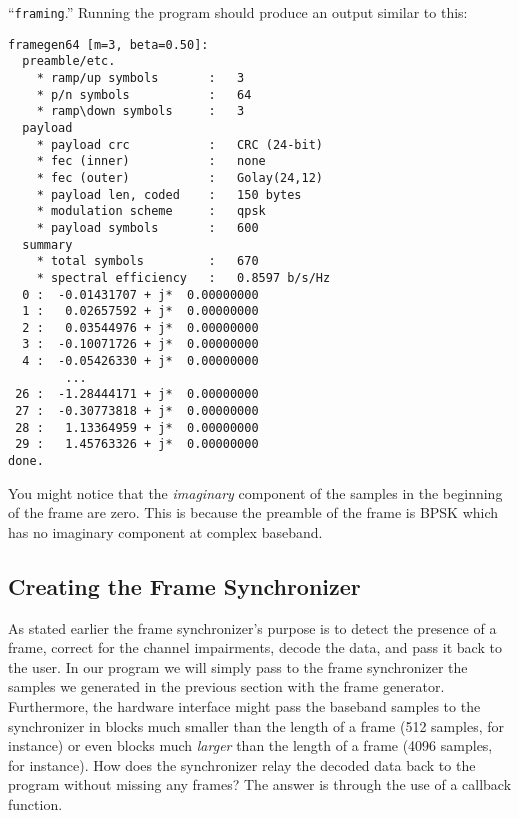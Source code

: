 ``{\tt framing}.''
Running the program should produce an output similar to this:
%
\begin{Verbatim}[fontsize=\small]
framegen64 [m=3, beta=0.50]:
  preamble/etc.
    * ramp/up symbols       :   3
    * p/n symbols           :   64
    * ramp\down symbols     :   3
  payload
    * payload crc           :   CRC (24-bit)
    * fec (inner)           :   none
    * fec (outer)           :   Golay(24,12)
    * payload len, coded    :   150 bytes
    * modulation scheme     :   qpsk
    * payload symbols       :   600
  summary
    * total symbols         :   670
    * spectral efficiency   :   0.8597 b/s/Hz
  0 :  -0.01431707 + j*  0.00000000
  1 :   0.02657592 + j*  0.00000000
  2 :   0.03544976 + j*  0.00000000
  3 :  -0.10071726 + j*  0.00000000
  4 :  -0.05426330 + j*  0.00000000
        ...
 26 :  -1.28444171 + j*  0.00000000
 27 :  -0.30773818 + j*  0.00000000
 28 :   1.13364959 + j*  0.00000000
 29 :   1.45763326 + j*  0.00000000
done.
\end{Verbatim}
%
You might notice that the {\em imaginary} component of the samples in
the beginning of the frame are zero.
This is because the preamble of the frame is BPSK which has no imaginary
component at complex baseband.

%
%
\subsection{Creating the Frame Synchronizer}
\label{tutorial:framing:framesync}

As stated earlier the frame synchronizer's purpose is to detect the
presence of a frame, correct for the channel impairments, decode the
data, and pass it back to the user.
In our program we will simply pass to the frame synchronizer the samples
we generated in the previous section with the frame generator.
Furthermore, the hardware interface might pass the baseband samples to
the synchronizer in blocks much smaller than the length of a frame
(512 samples, for instance)
or even blocks much {\em larger} than the length of a frame
(4096 samples, for instance).
How does the synchronizer relay the decoded data back to the program
without missing any frames?
The answer is through the use of a callback function.

